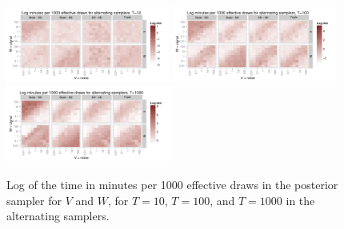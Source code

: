 \documentclass{article}
\begin{document}
\begin{figure}[!ht]
\centering
\includegraphics[width=0.48\textwidth]{../plots/altinttimeplot10}
\includegraphics[width=0.48\textwidth]{../plots/altinttimeplot100}
\includegraphics[width=0.48\textwidth]{../plots/altinttimeplot1000}
\caption{Log of the time in minutes per 1000 effective draws in the posterior sampler for $V$ and $W$, for $T=10$, $T=100$, and $T=1000$ in the alternating samplers.}
\label{altinttimeplot}
\end{figure}
\clearpage

\end{document}
